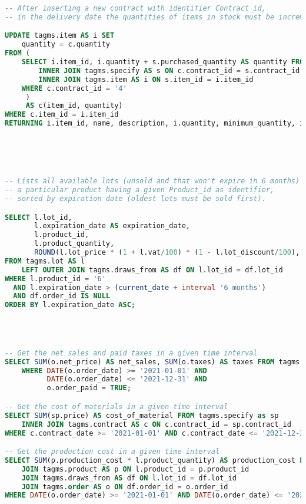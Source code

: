 \begin{lstlisting}[language=SQL,
keywordstyle=\color{blue},
stringstyle=\color{mauve},
showstringspaces=false,
breaklines=true,
basicstyle=\ttfamily\footnotesize]
-- After inserting a new contract with identifier Contract_id,
-- in the delivery date the quantities of items in stock must be incremented

UPDATE tagms.item AS i SET
    quantity = c.quantity
FROM (
    SELECT i.item_id, i.quantity + s.purchased_quantity AS quantity FROM tagms.contract AS c
        INNER JOIN tagms.specify AS s ON c.contract_id = s.contract_id
        INNER JOIN tagms.item AS i ON s.item_id = i.item_id
    WHERE c.contract_id = '4'
     )
     AS c(item_id, quantity)
WHERE c.item_id = i.item_id
RETURNING i.item_id, name, description, i.quantity, minimum_quantity, item_category_id;





-- Lists all available lots (unsold and that won't expire in 6 months) containing
-- a particular product having a given Product_id as identifier,
-- sorted by expiration date (oldest lots must be sold first).

SELECT l.lot_id,
       l.expiration_date AS expiration_date,
       l.product_id,
       l.product_quantity,
       ROUND(l.lot_price * (1 + l.vat/100) * (1 - l.lot_discount/100), 2) AS gross_price
FROM tagms.lot AS l
    LEFT OUTER JOIN tagms.draws_from AS df ON l.lot_id = df.lot_id
WHERE l.product_id = '6'
  AND l.expiration_date > (current_date + interval '6 months')
  AND df.order_id IS NULL
ORDER BY l.expiration_date ASC;




-- Get the net sales and paid taxes in a given time interval
SELECT SUM(o.net_price) AS net_sales, SUM(o.taxes) AS taxes FROM tagms.order AS o
    WHERE DATE(o.order_date) >= '2021-01-01' AND
          DATE(o.order_date) <= '2021-12-31' AND
          o.order_paid = TRUE;

-- Get the cost of materials in a given time interval
SELECT SUM(sp.price) AS cost_of_material FROM tagms.specify as sp
    INNER JOIN tagms.contract AS c ON c.contract_id = sp.contract_id
WHERE c.contract_date >= '2021-01-01' AND c.contract_date <= '2021-12-31';

-- Get the production cost in a given time interval
SELECT SUM(p.production_cost * l.product_quantity) AS production_cost FROM tagms.lot AS l
    JOIN tagms.product AS p ON l.product_id = p.product_id
    JOIN tagms.draws_from AS df ON l.lot_id = df.lot_id
    JOIN tagms.order AS o ON df.order_id = o.order_id
WHERE DATE(o.order_date) >= '2021-01-01' AND DATE(o.order_date) <= '2021-12-31';





\end{lstlisting}

